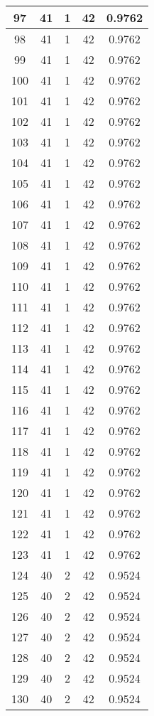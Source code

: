 \documentclass[letterpaper, 12pt]{article}
\begin{document}
\begin{longtable}{|c|c|c|c|c|}
\hline
97 & 41 & 1 & 42 & 0.9762 \\
\hline
98 & 41 & 1 & 42 & 0.9762 \\
\hline
99 & 41 & 1 & 42 & 0.9762 \\
\hline
100 & 41 & 1 & 42 & 0.9762 \\
\hline
101 & 41 & 1 & 42 & 0.9762 \\
\hline
102 & 41 & 1 & 42 & 0.9762 \\
\hline
103 & 41 & 1 & 42 & 0.9762 \\
\hline
104 & 41 & 1 & 42 & 0.9762 \\
\hline
105 & 41 & 1 & 42 & 0.9762 \\
\hline
106 & 41 & 1 & 42 & 0.9762 \\
\hline
107 & 41 & 1 & 42 & 0.9762 \\
\hline
108 & 41 & 1 & 42 & 0.9762 \\
\hline
109 & 41 & 1 & 42 & 0.9762 \\
\hline
110 & 41 & 1 & 42 & 0.9762 \\
\hline
111 & 41 & 1 & 42 & 0.9762 \\
\hline
112 & 41 & 1 & 42 & 0.9762 \\
\hline
113 & 41 & 1 & 42 & 0.9762 \\
\hline
114 & 41 & 1 & 42 & 0.9762 \\
\hline
115 & 41 & 1 & 42 & 0.9762 \\
\hline
116 & 41 & 1 & 42 & 0.9762 \\
\hline
117 & 41 & 1 & 42 & 0.9762 \\
\hline
118 & 41 & 1 & 42 & 0.9762 \\
\hline
119 & 41 & 1 & 42 & 0.9762 \\
\hline
120 & 41 & 1 & 42 & 0.9762 \\
\hline
121 & 41 & 1 & 42 & 0.9762 \\
\hline
122 & 41 & 1 & 42 & 0.9762 \\
\hline
123 & 41 & 1 & 42 & 0.9762 \\
\hline
124 & 40 & 2 & 42 & 0.9524 \\
\hline
125 & 40 & 2 & 42 & 0.9524 \\
\hline
126 & 40 & 2 & 42 & 0.9524 \\
\hline
127 & 40 & 2 & 42 & 0.9524 \\
\hline
128 & 40 & 2 & 42 & 0.9524 \\
\hline
129 & 40 & 2 & 42 & 0.9524 \\
\hline
130 & 40 & 2 & 42 & 0.9524 \\

\end{longtable}
\end{document}
